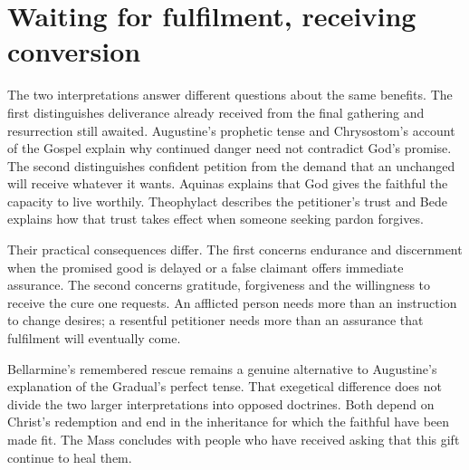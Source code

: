 \section{Waiting for fulfilment, receiving conversion}

The two interpretations answer different questions about the same
benefits. The first distinguishes deliverance already received from
the final gathering and resurrection still awaited. Augustine's
prophetic tense and Chrysostom's account of the Gospel explain why
continued danger need not contradict God's promise. The second
distinguishes confident petition from the demand that an unchanged
will receive whatever it wants. Aquinas explains that God gives the
faithful the capacity to live worthily. Theophylact describes the
petitioner's trust and Bede explains how that trust takes effect
when someone seeking pardon forgives.

Their practical consequences differ. The first concerns endurance
and discernment when the promised good is delayed or a false
claimant offers immediate assurance. The second concerns gratitude,
forgiveness and the willingness to receive the cure one requests.
An afflicted person needs more than an instruction to change
desires; a resentful petitioner needs more than an assurance
that fulfilment will eventually come.

Bellarmine's remembered rescue remains a genuine alternative
to Augustine's explanation of the Gradual's perfect tense.
That exegetical difference does not divide the two larger
interpretations into opposed doctrines. Both depend on
Christ's redemption and end in the inheritance for which
the faithful have been made fit. The Mass concludes with
people who have received asking that this gift continue
to heal them.
